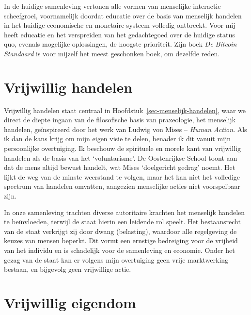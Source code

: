 \documentclass[
  a5paper,
  smalldemyvopaper,11pt,twoside,onecolumn,openright,extrafontsizes,
hidelinks]{memoir}
\begin{document}
In de huidige samenleving vertonen alle vormen van menselijke interactie
scheefgroei, voornamelijk doordat educatie over de basis van menselijk
handelen in het huidige economische en monetaire systeem volledig
ontbreekt. Voor mij heeft educatie en het verspreiden van het
gedachtegoed over de huidige status quo, evenals mogelijke oplossingen,
de hoogste prioriteit. Zijn boek \emph{De Bitcoin Standaard} is voor
mijzelf het meest geschonken boek, om dezelfde reden.

\section*{Vrijwillig handelen}\label{vrijwillig-handelen}


Vrijwillig handelen staat centraal in
Hoofdstuk~\ref{sec-menselijk-handelen}, waar we direct de diepte ingaan
van de filosofische basis van praxeologie, het menselijk handelen,
geïnspireerd door het werk van Ludwig von Mises -- \emph{Human Action}.
Als ik dan de kans krijg om mijn eigen visie te delen, benader ik dit
vanuit mijn persoonlijke overtuiging. Ik beschouw de spirituele en
morele kant van vrijwillig handelen als de basis van het `voluntarisme'.
De Oostenrijkse School toont aan dat de mens altijd bewust handelt, wat
Mises `doelgericht gedrag' noemt. Het lijkt de weg van de minste
weerstand te volgen, maar het kan niet het volledige spectrum van
handelen omvatten, aangezien menselijke acties niet voorspelbaar zijn.

In onze samenleving trachten diverse autoritaire krachten het menselijk
handelen te beïnvloeden, terwijl de staat hierin een leidende rol
speelt. Het bestaansrecht van de staat verkrijgt zij door dwang
(belasting), waardoor alle regelgeving de keuzes van mensen beperkt. Dit
vormt een ernstige bedreiging voor de vrijheid van het individu en is
schadelijk voor de samenleving en economie. Onder het gezag van de staat
kan er volgens mijn overtuiging geen vrije marktwerking bestaan, en
bijgevolg geen vrijwillige actie.

\section*{Vrijwillig eigendom}\label{vrijwillig-eigendom}

\end{document}
